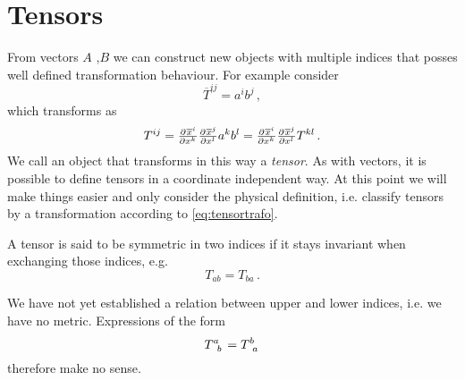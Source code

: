 \section{Tensors}
From vectors $A$ ,$B$ we can construct new objects with multiple indices that posses well defined transformation behaviour. 
For example consider
\begin{equation}
    \overline{T}^{ij}=a^ib^j\, ,
\end{equation}
which transforms as
\begin{equation}
    T^{ij}=\pd{\overline{x}^i}{{x^k}}\pd{\overline{x}^j}{{x^l}}a^kb^l=\pd{\overline{x}^i}{{x^k}}\pd{\overline{x}^j}{{x^l}}T^{kl}\,
   .\label{eq:tensortrafo}
\end{equation}
We call an object that transforms in this way a \emph{tensor}. 
As with vectors, it is possible to define tensors in a coordinate independent
way.
At this point we will make things easier and only consider the physical
definition, i.e. classify tensors by a transformation according to \eqref{eq:tensortrafo}.

A tensor is said to be symmetric in two indices if it stays invariant when exchanging those indices, e.g.
\begin{equation}
    T_{ab}=T_{ba}\, .
\end{equation}
\begin{remark}
We have not yet established a relation between upper and lower indices, i.e. we have no metric. Expressions of the form
\begin{equation}
    \tensor{T}{^a_b}=\tensor{T}{^b_a}
\end{equation}
therefore make no sense.
\end{remark}
